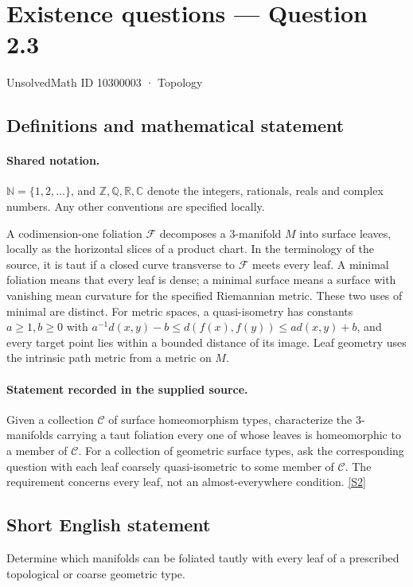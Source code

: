 \documentclass[11pt]{article}
\newcommand{\sref}[2]{\hyperlink{source:#1:#2}{[S#2]}}
\begin{document}
\setcounter{section}{10300002}
\section{Existence questions — Question 2.3}\label{10300003}
{\small\sffamily UnsolvedMath ID 10300003 · Topology}
\subsection{Definitions and mathematical statement}

\paragraph{Shared notation.}$\mathbb N=\{1,2,\ldots\}$, and $\mathbb Z,\mathbb Q,\mathbb R,\mathbb C$ denote the integers, rationals, reals and complex numbers. Any other conventions are specified locally.


A codimension-one foliation $\mathcal F$ decomposes a $3$-manifold $M$ into surface leaves, locally as the horizontal slices of a product chart. In the terminology of the source, it is taut if a closed curve transverse to $\mathcal F$ meets every leaf. A minimal foliation means that every leaf is dense; a minimal surface means a surface with vanishing mean curvature for the specified Riemannian metric. These two uses of minimal are distinct. For metric spaces, a quasi-isometry has constants $a\ge1,b\ge0$ with $a^{-1}d(x,y)-b\le d(f(x),f(y))\le a d(x,y)+b$, and every target point lies within a bounded distance of its image. Leaf geometry uses the intrinsic path metric from a metric on $M$.
\paragraph{Statement recorded in the supplied source.}
Given a collection $\mathscr C$ of surface homeomorphism types, characterize the $3$-manifolds carrying a taut foliation every one of whose leaves is homeomorphic to a member of $\mathscr C$. For a collection of geometric surface types, ask the corresponding question with each leaf coarsely quasi-isometric to some member of $\mathscr C$. The requirement concerns every leaf, not an almost-everywhere condition. \sref{10300003}{2}
\subsection{Short English statement}
Determine which manifolds can be foliated tautly with every leaf of a prescribed topological or coarse geometric type.
\end{document}
